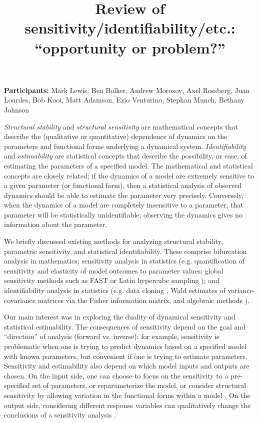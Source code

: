 \documentclass{article}
\title{Review of sensitivity/identifiability/etc.: “opportunity or problem?”}
\begin{document}
\textbf{Participants:} Mark Lewis, Ben Bolker, Andrew Morozov, Axel Rossberg, Juan Lourdes, Bob Kooi, Matt Adamson,  Ezio Venturino, Stephan Munch, Bethany Johnson


\emph{Structural stability} and \emph{structural sensitivity} are mathematical concepts that describe the (qualitative or quantitative) dependence of dynamics on the parameters and functional forms underlying a dynamical system. \emph{Identifiability} and \emph{estimability} are statistical concepts that describe the possibility, or ease, of estimating the parameters of a specified model. The mathematical and statistical concepts are closely related; if the dynamics of a model are extremely sensitive to a given parameter (or functional form), then a statistical analysis of observed dynamics should be able to estimate the parameter very precisely. Conversely, when the dynamics of a model are completely insensitive to a parameter, that parameter will be statistically unidentifiable; observing the dynamics gives no information about the parameter.

We briefly discussed existing methods for analyzing structural stability, parametric sensitivity, and statistical identifiability. These comprise bifurcation analysis in mathematics; sensitivity analysis in statistics (e.g. quantification of sensitivity and elasticity of model outcomes to parameter values; global sensitivity methods such as FAST \citep{mcrae_global_1982} or Latin hypercube sampling \citep{blower_drugs_1991}); and identifiability analysis in statistics (e.g. data cloning \citep{lele_data_2007,ponciano_hierarchical_2009,lele_estimability_2010}, Wald estimates of variance-covariance matrices via the Fisher information matrix, and algebraic methods \citep{meshkat_algorithm_2009,eisenberg_identifiability_2013}).

Our main interest was in exploring the duality of dynamical sensitivity and statistical estimability. The consequences of sensitivity depend on the goal and ``direction'' of analysis (forward vs. inverse): for example, sensitivity is problematic when one is trying to predict dynamics based on a specified model with known parameters, but convenient if one is trying to estimate parameters. Sensitivity and estimability also depend on which model inputs and outputs are chosen. On the input side, one can choose to focus on the sensitivity to a pre-specified set of parameters, or reparameterize the model, or consider structural sensitivity by allowing variation in the functional forms within a model \citep{adamson_when_2013}. On the output side, considering different response variables can qualitatively change the conclusions of a sensitivity analysis \citep{farcas_maximum_2016,li_essential_2017}.
\end{document}
